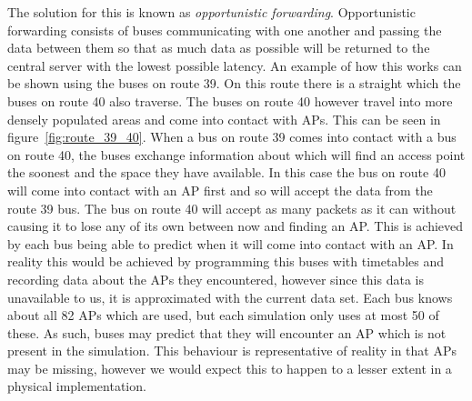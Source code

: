         The solution for this is known as \emph{opportunistic forwarding}. Opportunistic forwarding consists of buses communicating with one another and passing the data between them so that as much data as possible will be returned to the central server with the lowest possible latency. An example of how this works can be shown using the buses on route 39. On this route there is a straight which the buses on route 40 also traverse. The buses on route 40 however travel into more densely populated areas and come into contact with APs. This can be seen in figure~\ref{fig:route_39_40}. When a bus on route 39 comes into contact with a bus on route 40, the buses exchange information about which will find an access point the soonest and the space they have available. In this case the bus on route 40 will come into contact with an AP first and so will accept the data from the route 39 bus. The bus on route 40 will accept as many packets as it can without causing it to lose any of its own between now and finding an AP. This is achieved by each bus being able to predict when it will come into contact with an AP. In reality this would be achieved by programming this buses with timetables and recording data about the APs they encountered, however since this data is unavailable to us, it is approximated with the current data set. Each bus knows about all 82 APs which are used, but each simulation only uses at most 50 of these. As such, buses may predict that they will encounter an AP which is not present in the simulation. This behaviour is representative of reality in that APs may be missing, however we would expect this to happen to a lesser extent in a physical implementation.


